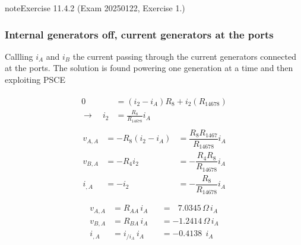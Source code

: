 \documentclass[letterpaper,10pt,english]{jupyterBook}
\begin{document}
\begin{sphinxadmonition}{note}{Exercise 11.4.2 (Exam 2025\sphinxhyphen{}01\sphinxhyphen{}22, Exercise 1.)}
\subsubsection*{Internal generators off, current generators at the ports}

\sphinxAtStartPar
Callling \(i_A\) and \(i_B\) the current passing through the current generators connected at the ports. The solution is found powering one generation at a time and then exploiting PSCE

\sphinxAtStartPar
{}
\begin{equation*}
\begin{split}\begin{aligned}
  0 & = (i_2 - i_A) R_8 + i_2 (R_{14678}) \\
\rightarrow \quad 
 i_2 & = \frac{R_8}{R_{14678}} i_A
\end{aligned}\end{split}
\end{equation*}\begin{equation*}
\begin{split}\begin{aligned}
  v_{A,A} & =  -R_8 ( i_2 - i_A ) & = \dfrac{R_8 R_{1467}}{R_{14678}} i_A \\
  v_{B,A} & = - R_4 i_2 & = - \dfrac{R_4 R_8}{R_{14678}} i_A \\
    i_{,A}& = - i_2 & = - \dfrac{R_8}{R_{14678}} i_A \\
\end{aligned}\end{split}
\end{equation*}\begin{equation*}
\begin{split}\begin{aligned}
 v_{A,A} & = R_{AA}   \, i_A && = \ \ \ 7.0345  \, \Omega \, i_A \\ 
 v_{B,A} & = R_{BA}   \, i_A && = - 1.2414  \, \Omega \, i_A \\
   i_{,A} & = i_{/i_A}\, i_A && = - 0.4138 \ \  i_A \\
\end{aligned}\end{split}
\end{equation*}
\sphinxAtStartPar
{}




\end{sphinxadmonition}
\end{document}

